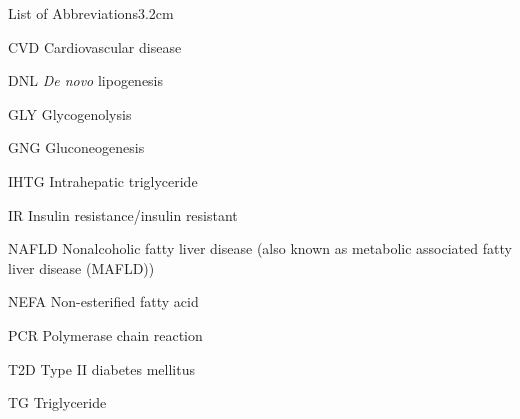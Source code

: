 \begin{mclistof}{List of Abbreviations}{3.2cm}

\item[CVD] Cardiovascular disease

\item[DNL] \textit{De novo} lipogenesis

\item[GLY] Glycogenolysis

\item[GNG] Gluconeogenesis

\item[IHTG] Intrahepatic triglyceride

\item[IR] Insulin resistance/insulin resistant

\item[NAFLD] Nonalcoholic fatty liver disease (also known as metabolic associated fatty liver disease (MAFLD))

\item[NEFA] Non-esterified fatty acid

\item[PCR] Polymerase chain reaction

\item[T2D] Type II diabetes mellitus 

\item[TG] Triglyceride

\end{mclistof} 
